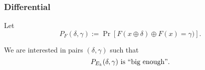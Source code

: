 \documentclass[11pt]{beamer}
\newcommand{\SBox}[2]{\draw (#1-0.4,#2) -- (#1+0.4,#2) -- (#1+0.4,#2-0.75) -- (#1-0.4,#2-0.75) -- cycle; \node at (#1,#2-0.4) {$S$} }
\newcommand{\KeyAdd}[2]{
\draw (#1, #2) -- (#1+0.5,#2); \node at (#1+0.25,#2) {\tiny $\oplus$};
\draw (#1,#2-0.25) -- (#1+0.5,#2-0.25);  \node at (#1+0.25,#2-0.25) {\tiny $\oplus$};
\draw (#1,#2-0.50) -- (#1+0.5,#2-0.50);   \node at (#1+0.25,#2-0.50) {\tiny $\oplus$};
\draw (#1,#2-0.75) -- (#1+0.5,#2-0.75);  \node at (#1+0.25,#2-0.75) {\tiny $\oplus$};
 }
\newcommand{\SBoxes}[1]{\SBox{#1}{0}; \SBox{#1}{1}; \SBox{#1}{2}; \SBox{#1}{3};}
\newcommand{\KeyAdds}[1]{\KeyAdd{#1}{0}; \KeyAdd{#1}{1}; \KeyAdd{#1}{2}; \KeyAdd{#1}{3};}
\newcommand{\Permutation}[1]{
\draw (#1,3.00) -- (#1+0.25,3.00) -- (#1+1,3.00) -- (#1+1.25,3.00);
\draw (#1,2.75) -- (#1+0.25,2.75) -- (#1+1,2.00) -- (#1+1.25,2.00);
\draw (#1,2.50) -- (#1+0.25,2.50) -- (#1+1,1.00) -- (#1+1.25,1.00);
\draw (#1,2.25) -- (#1+0.25,2.25) -- (#1+1,0.00) -- (#1+1.25,0.00);

\draw (#1,2.00) -- (#1+0.25,2.00) -- (#1+1,2.75) -- (#1+1.25,2.75);
\draw (#1,1.75) -- (#1+0.25,1.75) -- (#1+1,1.75) -- (#1+1.25,1.75);
\draw (#1,1.50) -- (#1+0.25,1.50) -- (#1+1,0.75) -- (#1+1.25,0.75);
\draw (#1,1.25) -- (#1+0.25,1.25) -- (#1+1,-0.25) -- (#1+1.25,-0.25);

\draw (#1,1.00) -- (#1+0.25,1.00) -- (#1+1,2.50) -- (#1+1.25,2.50);
\draw (#1,0.75) -- (#1+0.25,0.75) -- (#1+1,1.50) -- (#1+1.25,1.50);
\draw (#1,0.50) -- (#1+0.25,0.50) -- (#1+1,0.50) -- (#1+1.25,0.50);
\draw (#1,0.25) -- (#1+0.25,0.25) -- (#1+1,-0.50) -- (#1+1.25,-0.50);

\draw (#1,0.00)  -- (#1+0.25,0.00)   -- (#1+1,2.25) -- (#1+1.25,2.25);
\draw (#1,-0.25) -- (#1+0.25,-0.25) -- (#1+1,1.25) -- (#1+1.25,1.25);
\draw (#1,-0.50) -- (#1+0.25,-0.50) -- (#1+1,0.25) -- (#1+1.25,0.25);
\draw (#1,-0.75) -- (#1+0.25,-0.75) -- (#1+1,-0.75) -- (#1+1.25,-0.75);

}
\begin{document}
\begin{frame}
\frametitle{Differential}

Let $$P_F(\delta,\gamma) := \Pr[F(x \oplus \delta) \oplus F(x) = \gamma)].$$

We are interested in pairs $(\delta,\gamma)$ such that $$P_{E_k}(\delta,\gamma) \textnormal{ is ``big enough''}.$$

\begin{center}
\end{center}

\end{frame}
\end{document}

